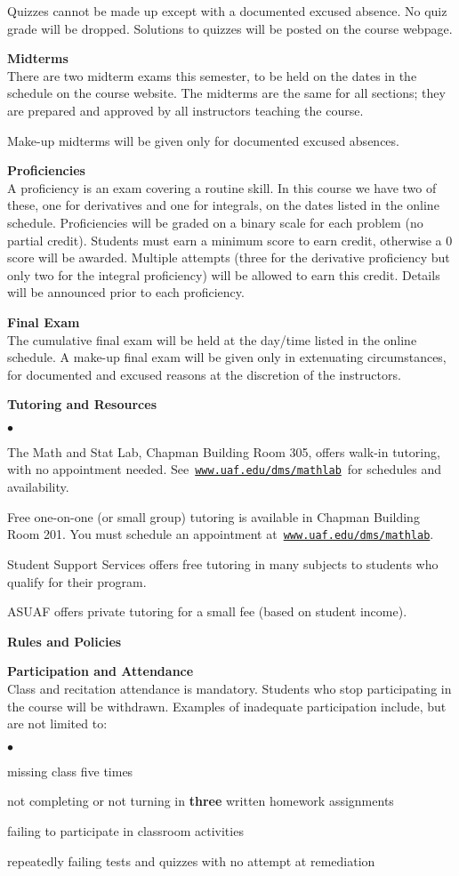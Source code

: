 \documentclass[12pt]{article}
\renewcommand{\emph}[1]{\textsf{\textbf{#1}}}
\newcommand{\localhead}[1]{\par\smallskip\textbf{#1}\nobreak\\}%
\def\heading#1{\localhead{\large\emph{#1}}}
\def\subheading#1{\localhead{\emph{#1}}}
\newenvironment{clist}%
{\bgroup\parskip 0pt\begin{list}{$\bullet$}{\partopsep 4pt\topsep 0pt\itemsep -2pt}}%
{\end{list}\egroup}%
\begin{document}
Quizzes cannot be made up except with a documented excused absence.  No quiz grade will be dropped. Solutions to quizzes will be posted on the course webpage.

\heading{Midterms}
There are two midterm exams this semester, to be held on the dates in the schedule on the course website.  The midterms are the same for all sections; they are prepared and approved by all instructors teaching the course. 

Make-up midterms will be given only for documented excused absences.

\heading{Proficiencies}
A proficiency is an exam covering a routine skill.  In this course we have two of these, one for derivatives and one for integrals, on the dates listed in the online schedule.  Proficiencies will be graded on a binary scale for each problem (no partial credit).  Students must earn a minimum score to earn credit, otherwise a 0 score will be awarded. Multiple attempts (three for the derivative proficiency but only two for the integral proficiency) will be allowed to earn this credit.  Details will be announced prior to each proficiency.

\heading{Final Exam}
The cumulative final exam will be held at the day/time listed in the online schedule. A make-up final exam will be given only in extenuating circumstances, for documented and excused reasons at the discretion of the instructors.

\heading{Tutoring and Resources}
\vskip -30pt\strut
\begin{clist}
	\item The Math and Stat Lab, Chapman Building Room 305, offers walk-in tutoring, with no appointment needed.  See\, \href{http://www.uaf.edu/dms/mathlab/}{\texttt{www.uaf.edu/dms/mathlab}}\, for schedules and availability.
	\item Free one-on-one (or small group) tutoring is available in Chapman Building Room 201. You must schedule an appointment at\, \href{http://www.uaf.edu/dms/mathlab/}{\texttt{www.uaf.edu/dms/mathlab}}.
	\item Student Support Services offers free tutoring in many subjects to students who qualify for their program.
	\item ASUAF offers private tutoring for a small fee (based on student income).
\end{clist}

\heading{Rules and Policies}
\vskip -20pt
\subheading{Participation and Attendance}
Class and recitation attendance is mandatory. Students who stop participating in the course will be withdrawn. Examples of inadequate participation include,
but are not limited to:
\begin{clist}
\item missing class five times
\item not completing or not turning in \textbf{three} written homework assignments
\item failing to participate in classroom activities
\item repeatedly failing tests and quizzes with no attempt at remediation
\end{clist}
\end{document}
